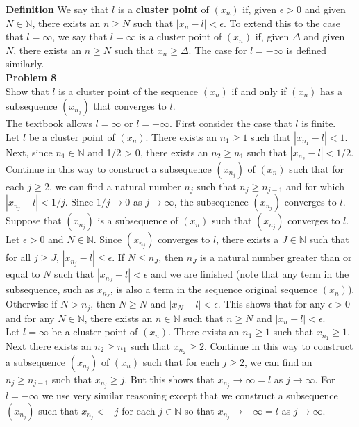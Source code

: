 \documentclass[a4paper]{article}
\begin{document}
{\bf Definition} We say that $l$ is a {\bf cluster point} of $(x_n)$ if, given $\epsilon > 0$ and given $N \in \mathbb{N}$, there exists an $n \geq N$ such that $|x_n - l| < \epsilon$. To extend this to the case that $l = \infty$, we say that $l = \infty$ is a cluster point of $(x_n)$ if, given $\Delta$ and given $N$, there exists an $n \geq N$ such that $x_n \geq \Delta$. The case for $l= -\infty$ is defined similarly. \\

{\bf Problem 8}\\
Show that $l$ is a cluster point of the sequence $(x_n)$ if and only if $(x_n)$ has a subsequence $(x_{n_j})$ that converges to $l$.\\

The textbook allows $l = \infty$ or $l = -\infty$. First consider the case that $l$ is finite. \\

Let $l$ be a cluster point of $(x_n)$. There exists an $n_1 \geq 1$ such that $|x_{n_1} - l| < 1$. Next, since $n_1 \in \mathbb{N}$ and 1/2 > 0, there exists an $n_2 \geq n_1$ such that $|x_{n_2} - l| < 1/2$. Continue in this way to construct a subsequence $(x_{n_j})$ of $(x_n)$ such that for each $j \geq 2$, we can find a natural number $n_j$ such that $n_j \geq n_{j-1}$ and for which $|x_{n_j} - l| < 1/j$. Since $1/j \rightarrow 0$ as $j \rightarrow \infty$, the subsequence $(x_{n_j})$ converges to $l$. \\

Suppose that $(x_{n_j})$ is a subsequence of $(x_n)$ such that $(x_{n_j})$ converges to $l$. Let $\epsilon >0$ and $N \in \mathbb{N}$. Since $(x_{n_j})$ converges to $l$, there exists a $J \in \mathbb{N}$ such that for all $j \geq J$, $|x_{n_j} -l| \leq \epsilon$. If $N \leq n_J$, then $n_J$ is a natural number greater than or equal to $N$ such that $|x_{n_J} - l| < \epsilon$ and we are finished (note that any term in the subsequence, such as $x_{n_J}$, is also a term in the sequence original sequence $(x_n)$). Otherwise if $N > n_j$, then $N \geq N$ and $|x_{N} - l|< \epsilon$. This shows that for any $\epsilon > 0 $ and for any $N \in \mathbb{N}$, there exists an $n\in \mathbb{N}$ such that $n \geq N$ and $|x_n - l| < \epsilon$. \\

Let $l = \infty$ be a cluster point of $(x_n)$. There exists an $n_1 \geq 1$ such that $x_{n_1} \geq 1$. Next there exists an $n_2 \geq n_1$ such that $x_{n_2} \geq 2$. Continue in this way to construct a subsequence $(x_{n_j})$ of $(x_n)$ such that for each $j \geq 2$, we can find an $n_j \geq n_{j-1}$ such that $x_{n_j} \geq j$. But this shows that $x_{n_j} \rightarrow \infty = l$ as $j \rightarrow \infty$. For $l = -\infty$ we use very similar reasoning except that we construct a subsequence $(x_{n_j})$ such that $x_{n_j} < -j$ for each $j \in \mathbb{N}$ so that $x_{n_j} \rightarrow -\infty = l$ as $j \rightarrow \infty$. \\
\end{document}
